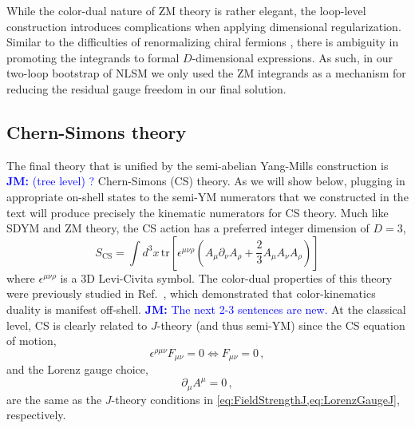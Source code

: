 \documentclass[11pt,letter]{article}
\newcommand{\jm}[1]{\textcolor{blue}{\textbf{JM: }{#1}}}
\def\be{\begin{equation}}
\def\ee{\end{equation}}
\begin{document}
While the color-dual nature of ZM theory is rather elegant, the
loop-level construction introduces complications when applying
dimensional regularization. Similar to the difficulties of
renormalizing chiral fermions \cite{tHooft:1972tcz}, there is ambiguity
in promoting the integrands to formal $D$-dimensional expressions. As
such, in our two-loop bootstrap of NLSM we only used the ZM
integrands as a mechanism for reducing the residual gauge freedom in
our final solution.


\subsection{Chern-Simons theory}
\label{sec:CSTheory}
The final theory that is unified by the semi-abelian Yang-Mills construction is \jm{(tree level) ?} Chern-Simons (CS) theory. As we will show below, plugging in appropriate on-shell states to the semi-YM numerators that we constructed in the text will produce precisely the kinematic numerators for CS theory. Much like SDYM and ZM theory, the CS action has a preferred integer dimension of $D=3$,
\be
S_{\text{CS}} = \int d^3 x \,\text{tr}\left[\epsilon^{\mu\nu\rho} \left(A_\mu \partial_\nu A_\rho + \frac{2}{3}A_{\mu}A_{\nu}A_{\rho}\right)\right]
\label{eq:CSAction}
\ee
where $\epsilon^{\mu\nu\rho}$ is a 3D Levi-Civita symbol. The color-dual properties of this theory were previously studied in Ref.~\cite{Ben-Shahar:2021zww}, which demonstrated that color-kinematics duality is manifest off-shell. \jm{The next 2-3 sentences are new.}
At the classical level, CS is clearly related to $J$-theory (and thus semi-YM) since the CS equation of motion,
\be
\epsilon^{\rho \mu \nu}F_{\mu\nu} =0 \Leftrightarrow F_{\mu\nu}=0 \, ,
\ee
and the Lorenz gauge choice,
\be
\partial_\mu A^\mu=0 \, ,
\ee
are the same as the $J$-theory conditions in \cref{eq:FieldStrengthJ,eq:LorenzGaugeJ}, respectively.
\end{document}
